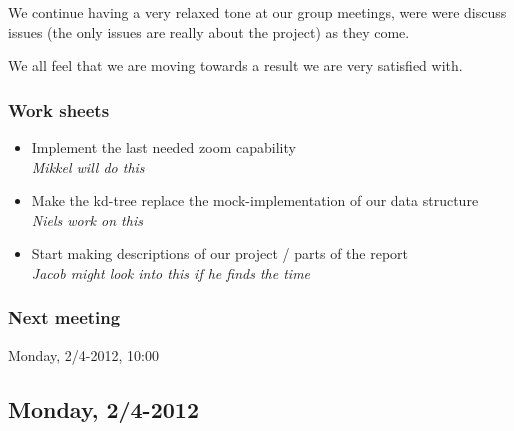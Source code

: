 \documentclass[a4paper,11pt]{article}
\begin{document}
We continue having a very relaxed tone at our group meetings, were were discuss issues (the only issues are really about the project) as they come.

We all feel that we are moving towards a result we are very satisfied with.

\subsubsection*{Work sheets}
\begin{itemize}
	\item Implement the last needed zoom capability \\
		\textsl{Mikkel will do this}
	\item Make the kd-tree replace the mock-implementation of our data structure \\
		\textsl{Niels work on this}
	\item Start making descriptions of our project / parts of the report \\
		\textsl{Jacob might look into this if he finds the time}
\end{itemize}

\subsubsection*{Next meeting}
Monday, 2/4-2012, 10:00


\pagebreak
\subsection{Monday, 2/4-2012}
\end{document}
